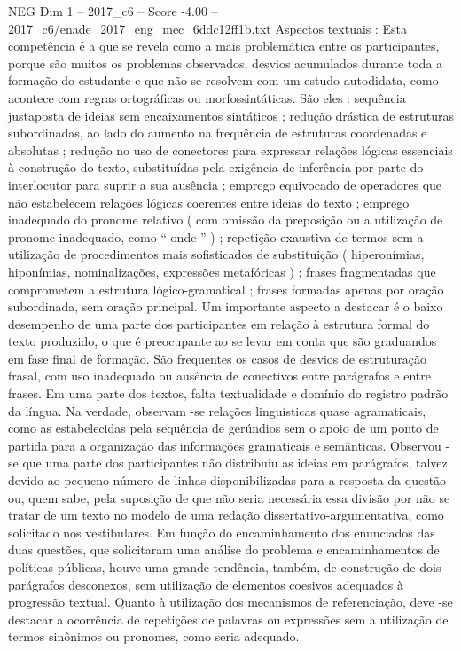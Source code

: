 \begin{textsample}{NEG Dim 1 – 2017\_c6 – Score -4.00 – 2017\_c6/enade\_2017\_eng\_mec\_6ddc12ff1b.txt}
Aspectos textuais : Esta competência é a que se revela como a mais problemática entre os participantes, porque são muitos os problemas observados, desvios acumulados durante toda a formação do estudante e que não se resolvem com um estudo autodidata, como acontece com regras ortográficas ou morfossintáticas.
São eles : sequência justaposta de ideias sem encaixamentos sintáticos ; redução drástica de estruturas subordinadas, ao lado do aumento na frequência de estruturas coordenadas e absolutas ; redução no uso de conectores para expressar relações lógicas essenciais à construção do texto, substituídas pela exigência de inferência por parte do interlocutor para suprir a sua ausência ; emprego equivocado de operadores que não estabelecem relações lógicas coerentes entre ideias do texto ; emprego inadequado do pronome relativo ( com omissão da preposição ou a utilização de pronome inadequado, como “ onde ” ) ; repetição exaustiva de termos sem a utilização de procedimentos mais sofisticados de substituição ( hiperonímias, hiponímias, nominalizações, expressões metafóricas ) ; frases fragmentadas que comprometem a estrutura lógico-gramatical ; frases formadas apenas por oração subordinada, sem oração principal.
Um importante aspecto a destacar é o baixo desempenho de uma parte dos participantes em relação à estrutura formal do texto produzido, o que é preocupante ao se levar em conta que são graduandos em fase final de formação.
São frequentes os casos de desvios de estruturação frasal, com uso inadequado ou ausência de conectivos entre parágrafos e entre frases.
Em uma parte dos textos, falta textualidade e domínio do registro padrão da língua.
Na verdade, observam -se relações linguísticas quase agramaticais, como as estabelecidas pela sequência de gerúndios sem o apoio de um ponto de partida para a organização das informações gramaticais e semânticas.
Observou -se que uma parte dos participantes não distribuiu as ideias em parágrafos, talvez devido ao pequeno número de linhas disponibilizadas para a resposta da questão ou, quem sabe, pela suposição de que não seria necessária essa divisão por não se tratar de um texto no modelo de uma redação dissertativo-argumentativa, como solicitado nos vestibulares.
Em função do encaminhamento dos enunciados das duas questões, que solicitaram uma análise do problema e encaminhamentos de políticas públicas, houve uma grande tendência, também, de construção de dois parágrafos desconexos, sem utilização de elementos coesivos adequados à progressão textual.
Quanto à utilização dos mecanismos de referenciação, deve -se destacar a ocorrência de repetições de palavras ou expressões sem a utilização de termos sinônimos ou pronomes, como seria adequado.

\end{textsample}
